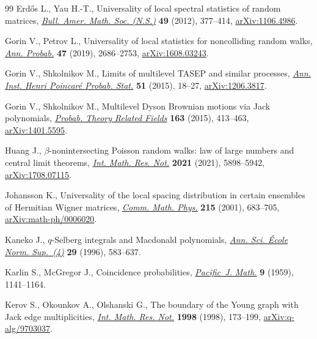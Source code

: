\documentclass[pdftex]{sigma}
\numberwithin{equation}{section}
\begin{document}
\begin{thebibliography}{99}
Erd\H{o}s L., Yau H.-T., Universality of local spectral statistics of random
 matrices, \href{https://doi.org/10.1090/S0273-0979-2012-01372-1}{\textit{Bull. Amer. Math. Soc. (N.S.)}} \textbf{49} (2012),
 377--414, \href{https://arxiv.org/abs/1106.4986}{arXiv:1106.4986}.

Gorin V., Petrov L., Universality of local statistics for noncolliding random
 walks, \href{https://doi.org/10.1214/18-AOP1315}{\textit{Ann. Probab.}} \textbf{47} (2019), 2686--2753,
 \href{https://arxiv.org/abs/1608.03243}{arXiv:1608.03243}.

Gorin V., Shkolnikov M., Limits of multilevel {TASEP} and similar processes,
 \href{https://doi.org/10.1214/13-AIHP555}{\textit{Ann. Inst. Henri Poincar\'e Probab. Stat.}} \textbf{51} (2015),
 18--27, \href{https://arxiv.org/abs/1206.3817}{arXiv:1206.3817}.

Gorin V., Shkolnikov M., Multilevel {D}yson {B}rownian motions via {J}ack
 polynomials, \href{https://doi.org/10.1007/s00440-014-0596-2}{\textit{Probab. Theory Related Fields}} \textbf{163} (2015),
 413--463, \href{https://arxiv.org/abs/1401.5595}{arXiv:1401.5595}.

Huang J., {$\beta$}-nonintersecting {P}oisson random walks: law of large
 numbers and central limit theorems, \href{https://doi.org/10.1093/imrn/rnz021}{\textit{Int. Math. Res. Not.}}
 \textbf{2021} (2021), 5898--5942, \href{https://arxiv.org/abs/1708.07115}{arXiv:1708.07115}.

Johansson K., Universality of the local spacing distribution in certain
 ensembles of {H}ermitian {W}igner matrices, \href{https://doi.org/10.1007/s002200000328}{\textit{Comm. Math. Phys.}}
 \textbf{215} (2001), 683--705, \href{https://arxiv.org/abs/math-ph/0006020}{arXiv:math-ph/0006020}.

Kaneko J., {$q$}-{S}elberg integrals and {M}acdonald polynomials, \href{https://doi.org/10.24033/asens.1749}{\textit{Ann.
 Sci. \'{E}cole Norm. Sup.~(4)}} \textbf{29} (1996), 583--637.

Karlin S., McGregor J., Coincidence probabilities, \href{https://doi.org/10.2140/pjm.1959.9.1141}{\textit{Pacific~J. Math.}}
 \textbf{9} (1959), 1141--1164.

Kerov S., Okounkov A., Olshanski G., The boundary of the {Y}oung graph with
 {J}ack edge multiplicities, \href{https://doi.org/10.1155/S1073792898000154}{\textit{Int. Math. Res. Not.}} \textbf{1998}
 (1998), 173--199, \href{https://arxiv.org/abs/q-alg/9703037}{arXiv:q-alg/9703037}.


\end{thebibliography}
\end{document}
